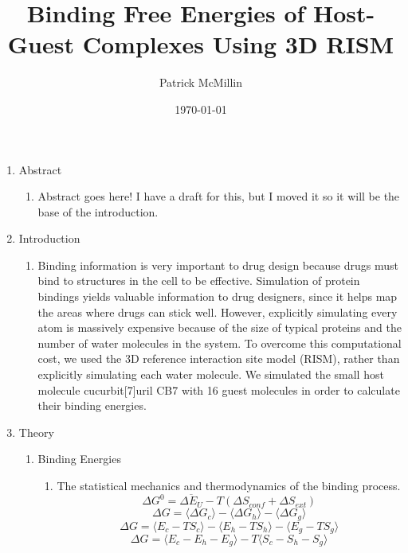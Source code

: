 \documentclass{article}
\title{Binding Free Energies of Host-Guest Complexes Using 3D RISM}
\author{Patrick McMillin}
\affil{Department of Physics and Astronomy, California State University Northridge}
\date{\today}
\begin{document}
\maketitle
\begin{enumerate}
	\item Abstract
	\begin{enumerate}
		\item Abstract goes here! I have a draft for this, but I moved it so it will be the base of the introduction.
	\end{enumerate}
	\item Introduction
	\begin{enumerate}
		\item Binding information is very important to drug design because drugs must bind to structures in the cell to be effective. Simulation of protein bindings yields valuable information to drug designers, since it helps map the areas where drugs can stick well. However, explicitly simulating every atom is massively expensive because of the size of typical proteins and the number of water molecules in the system. To overcome this computational cost, we used the 3D reference interaction site model (RISM), rather than explicitly simulating each water molecule. We simulated the small host molecule cucurbit[7]uril CB7 with 16 guest molecules in order to calculate their binding energies.
	\end{enumerate}
	\item Theory
	\begin{enumerate}
		\item Binding Energies
		\begin{enumerate}
			\item The statistical mechanics and thermodynamics of the binding process.
			\begin{equation}
				\Delta G^{0}=\overline{{\Delta E_{U}}}-T(\Delta S_{conf}+\Delta S_{ext})
			\end{equation}
			\begin{equation}
				\Delta G = \langle \Delta G_c \rangle - \langle \Delta G_h \rangle - \langle \Delta G_g \rangle
			\end{equation}
			\begin{equation}
				\Delta G = \langle E_c-TS_c \rangle - \langle	E_h-TS_h \rangle - \langle E_g-TS_g \rangle
			\end{equation}
			\begin{equation}
				\Delta G = \langle E_c - E_h - E_g \rangle - T\langle S_c - S_h - S_g\rangle
			\end{equation}

\end{enumerate}
\end{enumerate}
\end{enumerate}
\end{document}
